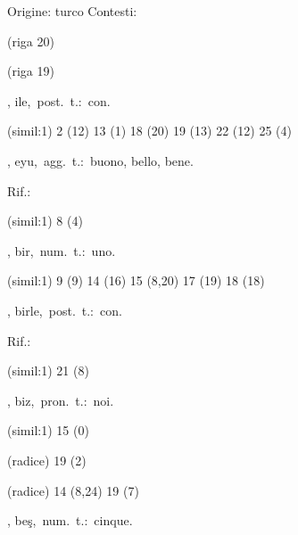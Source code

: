 \begin{glossario}{Origine: turco}
Contesti:
\begin{subvocedue}
\item[(riga 20)] 
\item[(riga 19)] 
\end{subvocedue}
\item[{\color{colorlowref}\spzrl{.Jl.H}},] {\sf ile},\ post.\ t.:\ con.
\begin{subvocedue}
\item[(simil:1)]   2 (12) 13 (1) 18 (20) 19 (13) 22 (12) 25 (4)
\end{subvocedue}
\item[{\color{colorlowref}\spzrl{^Ey.U}},] {\sf eyu},\ agg.\ t.:\ buono, bello, bene.
\begin{subvocedue}
\item[Rif.:] 
\end{subvocedue}
\begin{subvocedue}
\item[(simil:1)]   8 (4)
\end{subvocedue}
\item[{\color{colorlowref}\spzrl{bir}},] {\sf bir},\ num.\ t.:\ uno.
\begin{subvocedue}
\item[(simil:1)]   9 (9) 14 (16) 15 (8,20) 17 (19) 18 (18)
\end{subvocedue}
\item[{\color{colorlowref}\spzrl{birl.H}},] {\sf birle},\ post.\ t.:\ con.
\begin{subvocedue}
\item[Rif.:] 
\end{subvocedue}
\begin{subvocedue}
\item[(simil:1)]   21 (8)
\end{subvocedue}
\item[{\color{colorlowref}\spzrl{biz}},] {\sf biz},\ pron.\ t.:\ noi.
\begin{subvocedue}
\item[(simil:1)]   15 (0)
\item[(radice)]   19 (2)
\item[(radice)]   14 (8,24) 19 (7)
\end{subvocedue}
\item[{\color{colorlowref}\spzrl{be^s}},] {\sf beş},\ num.\ t.:\ cinque.
\begin{subvocedue}

\end{subvocedue}
\end{glossario}

